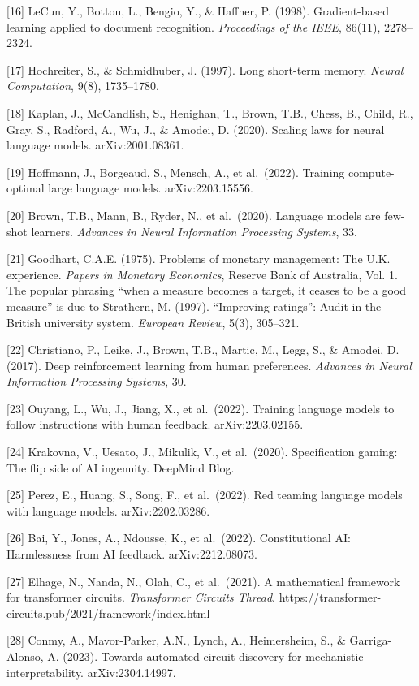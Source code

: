 \documentclass[12pt]{article}
\begin{document}
{[}16{]} LeCun, Y., Bottou, L., Bengio, Y., \& Haffner, P. (1998).
Gradient-based learning applied to document recognition.
\emph{Proceedings of the IEEE}, 86(11), 2278--2324.

{[}17{]} Hochreiter, S., \& Schmidhuber, J. (1997). Long short-term
memory. \emph{Neural Computation}, 9(8), 1735--1780.

{[}18{]} Kaplan, J., McCandlish, S., Henighan, T., Brown, T.B., Chess,
B., Child, R., Gray, S., Radford, A., Wu, J., \& Amodei, D. (2020).
Scaling laws for neural language models. arXiv:2001.08361.

{[}19{]} Hoffmann, J., Borgeaud, S., Mensch, A., et al.~(2022). Training
compute-optimal large language models. arXiv:2203.15556.

{[}20{]} Brown, T.B., Mann, B., Ryder, N., et al.~(2020). Language
models are few-shot learners. \emph{Advances in Neural Information
Processing Systems}, 33.

{[}21{]} Goodhart, C.A.E. (1975). Problems of monetary management: The
U.K. experience. \emph{Papers in Monetary Economics}, Reserve Bank of
Australia, Vol. 1. The popular phrasing ``when a measure becomes a
target, it ceases to be a good measure'' is due to Strathern, M. (1997).
``Improving ratings'': Audit in the British university system.
\emph{European Review}, 5(3), 305--321.

{[}22{]} Christiano, P., Leike, J., Brown, T.B., Martic, M., Legg, S.,
\& Amodei, D. (2017). Deep reinforcement learning from human
preferences. \emph{Advances in Neural Information Processing Systems},
30.

{[}23{]} Ouyang, L., Wu, J., Jiang, X., et al.~(2022). Training language
models to follow instructions with human feedback. arXiv:2203.02155.

{[}24{]} Krakovna, V., Uesato, J., Mikulik, V., et al.~(2020).
Specification gaming: The flip side of AI ingenuity. DeepMind Blog.

{[}25{]} Perez, E., Huang, S., Song, F., et al.~(2022). Red teaming
language models with language models. arXiv:2202.03286.

{[}26{]} Bai, Y., Jones, A., Ndousse, K., et al.~(2022). Constitutional
AI: Harmlessness from AI feedback. arXiv:2212.08073.

{[}27{]} Elhage, N., Nanda, N., Olah, C., et al.~(2021). A mathematical
framework for transformer circuits. \emph{Transformer Circuits Thread}.
https://transformer-circuits.pub/2021/framework/index.html

{[}28{]} Conmy, A., Mavor-Parker, A.N., Lynch, A., Heimersheim, S., \&
Garriga-Alonso, A. (2023). Towards automated circuit discovery for
mechanistic interpretability. arXiv:2304.14997.
\end{document}
